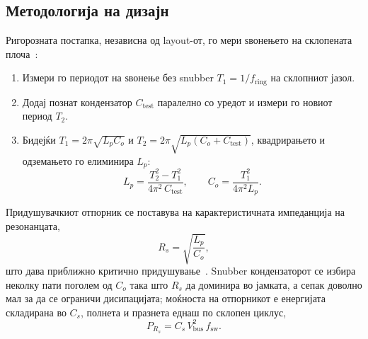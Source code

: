 \documentclass[journal,onecolumn,11pt]{IEEEtran}
\newcommand{\Vdcbus}{V_{\mathrm{bus}}}
\newcommand{\Fswsw}{f_{\mathrm{sw}}}
\begin{document}
\subsection{Методологија на дизајн}
Ригорозната постапка, независна од layout-от, го мери ѕвонењето на склопената
плоча~\cite{severns,digikey_snubber}:
\begin{enumerate}[leftmargin=1.4em]
\item Измери го периодот на ѕвонење без snubber $T_1=1/f_{\mathrm{ring}}$ на склопниот јазол.
\item Додај познат кондензатор $C_{\mathrm{test}}$ паралелно со уредот и измери го новиот период $T_2$.
\item Бидејќи $T_1=2\pi\sqrt{L_pC_o}$ и $T_2=2\pi\sqrt{L_p(C_o+C_{\mathrm{test}})}$, квадрирањето и
одземањето го елиминира $L_p$:
\begin{equation}
L_p=\frac{T_2^{2}-T_1^{2}}{4\pi^{2}\,C_{\mathrm{test}}},\qquad
C_o=\frac{T_1^{2}}{4\pi^{2}L_p}.
\label{eq:extract}
\end{equation}
\end{enumerate}
Придушувачкиот отпорник се поставува на карактеристичната импеданција на резонанцата,
\begin{equation}
R_s=\sqrt{\frac{L_p}{C_o}},
\label{eq:rs}
\end{equation}
што дава приближно критично придушување~\cite{digikey_snubber}. Snubber кондензаторот
се избира неколку пати поголем од $C_o$ така што $R_s$ да доминира во јамката, а сепак
доволно мал за да се ограничи дисипацијата; моќноста на отпорникот е енергијата
складирана во $C_s$, полнета и празнета еднаш по склопен циклус,
\begin{equation}
P_{R_s}=C_s\,\Vdcbus^{2}\,\Fswsw .
\label{eq:psnub}
\end{equation}
\end{document}
